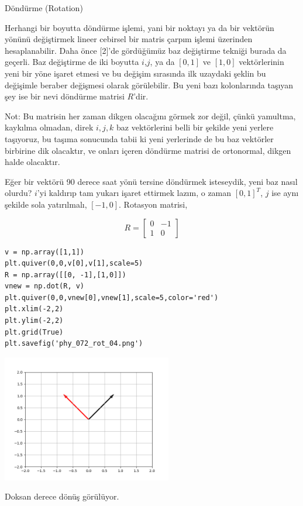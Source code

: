 \documentclass[12pt,fleqn]{article}\usepackage{../../common}
\begin{document}
Döndürme (Rotation)

Herhangi bir boyutta döndürme işlemi, yani bir noktayı ya da bir vektörün yönünü
değiştirmek lineer cebirsel bir matris çarpım işlemi üzerinden hesaplanabilir.
Daha önce [2]'de gördüğümüz baz değiştirme tekniği burada da geçerli. Baz
değiştirme de iki boyutta $i$,$j$, ya da $[0,1]$ ve $[1,0]$ vektörlerinin
yeni bir yöne işaret etmesi ve bu değişim sırasında ilk uzaydaki şeklin
bu değişimle beraber değişmesi olarak görülebilir. Bu yeni bazı kolonlarında
taşıyan şey ise bir nevi döndürme matrisi $R$'dir.

Not: Bu matrisin her zaman dikgen olacağını görmek zor değil, çünkü yamultma,
kaykılma olmadan, direk $i,j,k$ baz vektörlerini belli bir şekilde yeni yerlere
taşıyoruz, bu taşıma sonucunda tabii ki yeni yerlerinde de bu baz vektörler
birbirine dik olacaktır, ve onları içeren döndürme matrisi de ortonormal, dikgen
halde olacaktır.

Eğer bir vektörü 90 derece saat yönü tersine döndürmek isteseydik, yeni baz
nasıl olurdu? $i$'yi kaldırıp tam yukarı işaret ettirmek lazım, o zaman
$[0,1]^T$, $j$ ise aynı şekilde sola yatırılmalı, $[-1, 0]$. Rotasyon matrisi,

$$
R = \left[\begin{array}{rr}
0 & -1 \\ 1 & 0
\end{array}\right]
$$


\begin{verbatim}
v = np.array([1,1])
plt.quiver(0,0,v[0],v[1],scale=5)
R = np.array([[0, -1],[1,0]])
vnew = np.dot(R, v)
plt.quiver(0,0,vnew[0],vnew[1],scale=5,color='red')
plt.xlim(-2,2)
plt.ylim(-2,2)
plt.grid(True)
plt.savefig('phy_072_rot_04.png')
\end{verbatim}

\includegraphics[width=20em]{phy_072_rot_04.png}

Doksan derece dönüş görülüyor.
\end{document}
